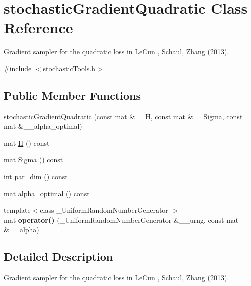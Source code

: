 \hypertarget{classstochasticGradientQuadratic}{\section{stochastic\-Gradient\-Quadratic Class Reference}
\label{classstochasticGradientQuadratic}
}


Gradient sampler for the quadratic loss in Le\-Cun , Schaul, Zhang (2013).  




{\ttfamily \#include $<$stochastic\-Tools.\-h$>$}

\subsection*{Public Member Functions}
\begin{DoxyCompactItemize}
\item 
\hyperlink{classstochasticGradientQuadratic_a50cac3ebdc38174f41dec59f520da292}{stochastic\-Gradient\-Quadratic} (const mat \&\-\_\-\-\_\-\-H, const mat \&\-\_\-\-\_\-\-Sigma, const mat \&\-\_\-\-\_\-alpha\-\_\-optimal)
\item 
mat \hyperlink{classstochasticGradientQuadratic_a32248c803d44fef1e4519f9ade6b983b}{H} () const 
\item 
mat \hyperlink{classstochasticGradientQuadratic_a55ae02e7935619e67f128fde15c03e62}{Sigma} () const 
\item 
int \hyperlink{classstochasticGradientQuadratic_acd98e4c4a4e740827330e329cea2f7b5}{par\-\_\-dim} () const 
\item 
mat \hyperlink{classstochasticGradientQuadratic_ab69db686628580d8f3c2246c601ccb50}{alpha\-\_\-optimal} () const 
\item 
\hypertarget{classstochasticGradientQuadratic_ad1aadf35bf711ad8b2ed0d76c9b57959}{{\footnotesize template$<$class \-\_\-\-Uniform\-Random\-Number\-Generator $>$ }\\mat {\bfseries operator()} (\-\_\-\-Uniform\-Random\-Number\-Generator \&\-\_\-\-\_\-urng, const mat \&\-\_\-\-\_\-alpha)}\label{classstochasticGradientQuadratic_ad1aadf35bf711ad8b2ed0d76c9b57959}

\end{DoxyCompactItemize}


\subsection{Detailed Description}
Gradient sampler for the quadratic loss in Le\-Cun , Schaul, Zhang (2013). 

